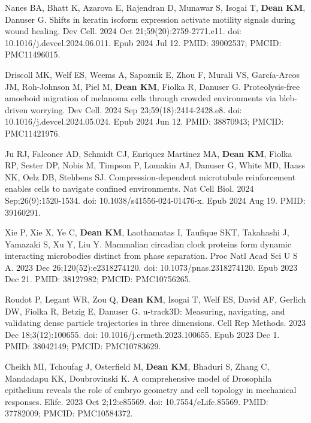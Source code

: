 \begin{etaremune}
\item Nanes BA, Bhatt K, Azarova E, Rajendran D, Munawar S, Isogai T, \textbf{Dean KM}, Danuser G. Shifts in keratin isoform expression activate motility signals during wound healing. Dev Cell. 2024 Oct 21;59(20):2759-2771.e11. doi: 10.1016/j.devcel.2024.06.011. Epub 2024 Jul 12. PMID: 39002537; PMCID: PMC11496015.

\item Driscoll MK, Welf ES, Weems A, Sapoznik E, Zhou F, Murali VS, García-Arcos JM, Roh-Johnson M, Piel M, \textbf{Dean KM}, Fiolka R, Danuser G. Proteolysis-free amoeboid migration of melanoma cells through crowded environments via bleb-driven worrying. Dev Cell. 2024 Sep 23;59(18):2414-2428.e8. doi: 10.1016/j.devcel.2024.05.024. Epub 2024 Jun 12. PMID: 38870943; PMCID: PMC11421976.

\item Ju RJ, Falconer AD, Schmidt CJ, Enriquez Martinez MA, \textbf{Dean KM}, Fiolka RP, Sester DP, Nobis M, Timpson P, Lomakin AJ, Danuser G, White MD, Haass NK, Oelz DB, Stehbens SJ. Compression-dependent microtubule reinforcement enables cells to navigate confined environments. Nat Cell Biol. 2024 Sep;26(9):1520-1534. doi: 10.1038/s41556-024-01476-x. Epub 2024 Aug 19. PMID: 39160291.

\item Xie P, Xie X, Ye C, \textbf{Dean KM}, Laothamatas I, Taufique SKT, Takahashi J, Yamazaki S, Xu Y, Liu Y. Mammalian circadian clock proteins form dynamic interacting microbodies distinct from phase separation. Proc Natl Acad Sci U S A. 2023 Dec 26;120(52):e2318274120. doi: 10.1073/pnas.2318274120. Epub 2023 Dec 21. PMID: 38127982; PMCID: PMC10756265.

\item Roudot P, Legant WR, Zou Q, \textbf{Dean KM}, Isogai T, Welf ES, David AF, Gerlich DW, Fiolka R, Betzig E, Danuser G. u-track3D: Measuring, navigating, and validating dense particle trajectories in three dimensions. Cell Rep Methods. 2023 Dec 18;3(12):100655. doi: 10.1016/j.crmeth.2023.100655. Epub 2023 Dec 1. PMID: 38042149; PMCID: PMC10783629.

\item Cheikh MI, Tchoufag J, Osterfield M, \textbf{Dean KM}, Bhaduri S, Zhang C, Mandadapu KK, Doubrovinski K. A comprehensive model of Drosophila epithelium reveals the role of embryo geometry and cell topology in mechanical responses. Elife. 2023 Oct 2;12:e85569. doi: 10.7554/eLife.85569. PMID: 37782009; PMCID: PMC10584372.


\end{etaremune}
